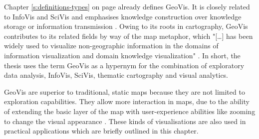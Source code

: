 Chapter \ref{s:definitions-types} on page \pageref{s:definitions-types} already defines \ac{GeoVis}. It is closely related to \ac{InfoVis} and \ac{SciVis} and emphasises knowledge construction over knowledge storage or information transmission . Owing to its roots in cartography, \ac{GeoVis} contributes to its related fields by way of the map metaphor, which "[\ldots] has been widely used to visualize non-geographic information in the domains of information visualization and domain knowledge visualization" .
In short, the thesis uses the term \ac{GeoVis} as a hypernym for the combination of exploratory data analysis, \ac{InfoVis}, \ac{SciVis}, thematic cartography and visual analytics.

\ac{GeoVis} are superior to traditional, static maps because they are not limited to exploration capabilities. They allow more interaction in maps, due to the ability of extending the basic layer of the map with user-experience abilities like zooming to change the visual appearance . These kinds of visualisations are also used in practical applications which are briefly outlined in this chapter.

